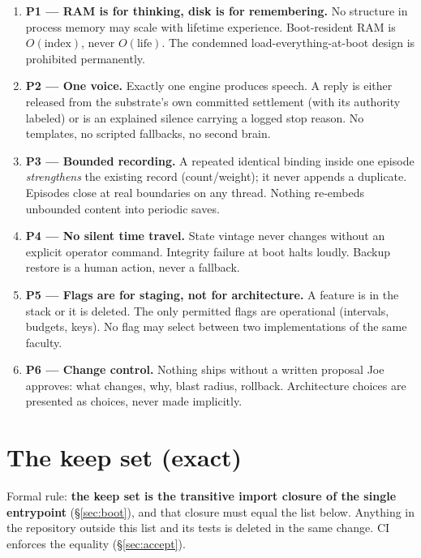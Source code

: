\documentclass[11pt]{article}
\begin{document}
\begin{enumerate}[nosep]
  \item \textbf{P1 — RAM is for thinking, disk is for remembering.} No
        structure in process memory may scale with lifetime experience.
        Boot-resident RAM is $O(\text{index})$, never $O(\text{life})$.
        The condemned load-everything-at-boot design is prohibited
        permanently.
  \item \textbf{P2 — One voice.} Exactly one engine produces speech. A reply
        is either released from the substrate's own committed settlement
        (with its authority labeled) or is an explained silence carrying a
        logged stop reason. No templates, no scripted fallbacks, no second
        brain.
  \item \textbf{P3 — Bounded recording.} A repeated identical binding inside
        one episode \emph{strengthens} the existing record (count/weight);
        it never appends a duplicate. Episodes close at real boundaries on
        any thread. Nothing re-embeds unbounded content into periodic saves.
  \item \textbf{P4 — No silent time travel.} State vintage never changes
        without an explicit operator command. Integrity failure at boot
        halts loudly. Backup restore is a human action, never a fallback.
  \item \textbf{P5 — Flags are for staging, not for architecture.} A feature
        is in the stack or it is deleted. The only permitted flags are
        operational (intervals, budgets, keys). No flag may select between
        two implementations of the same faculty.
  \item \textbf{P6 — Change control.} Nothing ships without a written
        proposal Joe approves: what changes, why, blast radius, rollback.
        Architecture choices are presented as choices, never made
        implicitly.
\end{enumerate}

\section{The keep set (exact)}

Formal rule: \textbf{the keep set is the transitive import closure of the
single entrypoint} (\S\ref{sec:boot}), and that closure must equal the list
below. Anything in the repository outside this list and its tests is deleted
in the same change. CI enforces the equality (\S\ref{sec:accept}).
\end{document}
